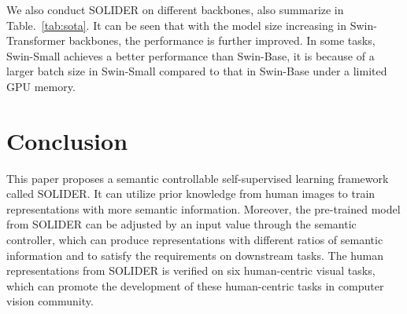 \documentclass[10pt,twocolumn,letterpaper]{article}
\begin{document}
We also conduct SOLIDER on different backbones, also summarize in Table.~\ref{tab:sota}.
It can be seen that with the model size increasing in Swin-Transformer backbones, the performance is further improved. In some tasks, Swin-Small achieves a better performance than Swin-Base, it is because of a larger batch size in Swin-Small compared to that in Swin-Base under a limited GPU memory.

\section{Conclusion}
This paper proposes a semantic controllable self-supervised learning framework called SOLIDER. It can utilize prior knowledge from human images to train representations with more semantic information. Moreover, the pre-trained model from SOLIDER can be adjusted by an input  value through the semantic controller, which can produce representations with different ratios of semantic information and to satisfy the requirements on downstream tasks. The human representations from SOLIDER is verified on six human-centric visual tasks, which can promote the development of these human-centric tasks in computer vision community.


{\small


}
\end{document}
